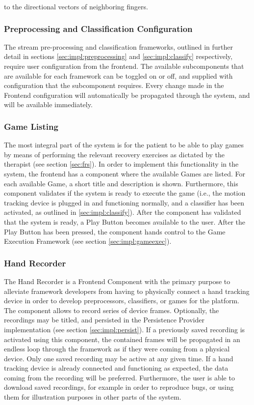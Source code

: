 to the directional vectors of neighboring fingers.

\subsubsection{Preprocessing and Classification Configuration}
The stream pre-processing and classification frameworks, outlined in further detail in sections \ref{sec:impl:preprocessing} and \ref{sec:impl:classify} respectively, require user configuration from the frontend. The available subcomponents that are available for each framework can be toggled on or off, and supplied with configuration that the subcomponent requires. Every change made in the Frontend configuration will automatically be propagated through the system, and will be available immediately.

\subsubsection{Game Listing}
The most integral part of the system is for the patient to be able to play games by means of performing the relevant recovery exercises as dictated by the therapist (see section \ref{sec:frs}). In order to implement this functionality in the system, the frontend has a component where the available Games are listed. For each available Game, a short title and description is shown. Furthermore, this component validates if the system is ready to execute the game (i.e., the motion tracking device is plugged in and functioning normally, and a classifier has been activated, as outlined in \ref{sec:impl:classify}). After the component has validated that the system is ready, a Play Button becomes available to the user. After the Play Button has been pressed, the component hands control to the Game Execution Framework (see section \ref{sec:impl:gameexec}).

\subsubsection{Hand Recorder}
\label{sec:impl:hand-recorder}
The Hand Recorder is a Frontend Component with the primary purpose to alleviate framework developers from having to physically connect a hand tracking device in order to develop preprocessors, classifiers, or games for the platform. The component allows to record series of device frames. Optionally, the recordings may be titled, and persisted in the Persistence Provider implementation (see section \ref{sec:impl:persist}). If a previously saved recording is activated using this component, the contained frames will be propagated in an endless loop through the framework as if they were coming from a physical device. Only one saved recording may be active at any given time. If a hand tracking device is already connected and functioning as expected, the data coming from the recording will be preferred. Furthermore, the user is able to download saved recordings, for example in order to reproduce bugs, or using them for illustration purposes in other parts of the system.

